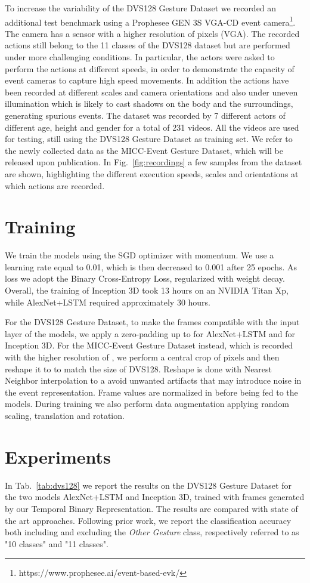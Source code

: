 \documentclass[a4paper,conference]{IEEEtran}
\begin{document}
To increase the variability of the DVS128 Gesture Dataset we recorded an additional test benchmark using a Prophesee GEN 3S VGA-CD event camera\footnote{https://www.prophesee.ai/event-based-evk/}. The camera has a sensor with a higher resolution of  pixels (VGA). The recorded actions still belong to the 11 classes of the DVS128 dataset but are performed under more challenging conditions. In particular, the actors were asked to perform the actions at different speeds, in order to demonstrate the capacity of event cameras to capture high speed movements. In addition the actions have been recorded at different scales and camera orientations and also under uneven illumination which is likely to cast shadows on the body and the surroundings, generating spurious events.
The dataset was recorded by 7 different actors of different age, height and gender for a total of 231 videos. All the videos are used for testing, still using the DVS128 Gesture Dataset as training set.
We refer to the newly collected data as the MICC-Event Gesture Dataset, which will be released upon publication.
In Fig.~\ref{fig:recordings} a few samples from the dataset are shown, highlighting the different execution speeds, scales and orientations at which actions are recorded.

\section{Training}
\label{sec:training}
We train the models using the SGD optimizer with momentum. We use a learning rate equal to 0.01, which is then decreased to 0.001 after 25 epochs. As loss we adopt the Binary Cross-Entropy Loss, regularized with weight decay. Overall, the training of Inception 3D took 13 hours on an NVIDIA Titan Xp, while AlexNet+LSTM required approximately 30 hours.

For the DVS128 Gesture Dataset, to make the frames compatible with the input layer of the models, we apply a zero-padding up to  for AlexNet+LSTM and  for Inception 3D. For the MICC-Event Gesture Dataset instead, which is recorded with the higher resolution of , we perform a central crop of  pixels and then reshape it to  to match the size of DVS128. Reshape is done with Nearest Neighbor interpolation to a avoid unwanted artifacts that may introduce noise in the event representation.
Frame values are normalized in  before being fed to the models.
During training we also perform data augmentation applying random scaling, translation and rotation.

\section{Experiments}
\label{sec:experiments}
In Tab.~\ref{tab:dvs128} we report the results on the DVS128 Gesture Dataset for the two models AlexNet+LSTM and Inception 3D, trained with frames generated by our Temporal Binary Representation. The results are compared with state of the art approaches. Following prior work, we report the classification accuracy both including and excluding the \textit{Other Gesture} class, respectively referred to as "10 classes" and "11 classes".
\end{document}
